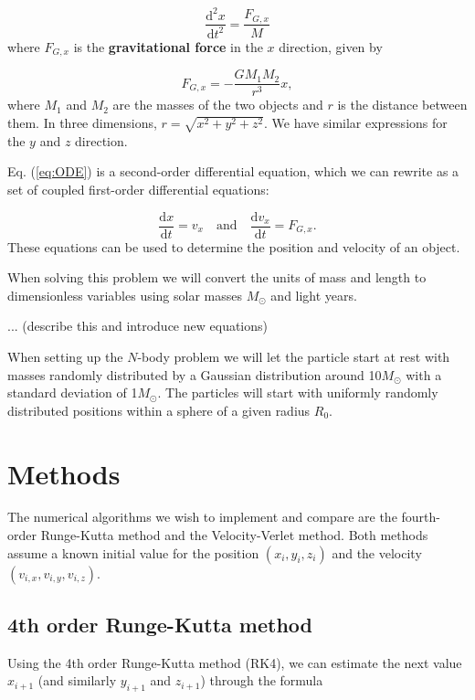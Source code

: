 \documentclass{article}
\begin{document}
\begin{multicols}{2}
\begin{equation}\label{eq:ODE}
	\frac{\mathrm{d}^2 x}{\mathrm{d}t^2} = \frac{F_{G,x}}{M}
\end{equation}
where $F_{G,x}$ is the \textbf{gravitational force} in the $x$ direction, given by 

\begin{equation}\label{eq:force_comp}
	F_{G,x} = - \frac{G M_1 M_2}{r^3}x,
\end{equation}
where $M_1$ and $M_2$ are the masses of the two objects and $r$ is the distance between them. In three dimensions, $r = \sqrt{x^2 + y^2 + z^2}$. We have similar expressions for the $y$ and $z$ direction.

Eq. (\ref{eq:ODE}) is a second-order differential equation, which we can rewrite as a set of coupled first-order differential equations:

\begin{equation}
	\frac{\mathrm{d}x}{\mathrm{d}t} = v_x  \quad \mathrm{and} \quad \frac{\mathrm{d}v_x}{\mathrm{d}t} = F_{G,x}.
\end{equation}
These equations can be used to determine the position and velocity of an object.

When solving this problem we will convert the units of mass and length to dimensionless variables using solar masses $M_{\odot}$ and light years. 

... (describe this and introduce new equations)

When setting up the $N$-body problem we will let the particle start at rest with masses randomly distributed by a Gaussian distribution around 10$M_{\odot}$ with a standard deviation of 1$M_{\odot}$. The particles will start with uniformly randomly distributed positions within a sphere of a given radius $R_0$. 




\section{Methods}

The numerical algorithms we wish to implement and compare are the fourth-order Runge-Kutta method and the Velocity-Verlet method. Both methods assume a known initial value for the position $(x_i,y_i,z_i)$ and the velocity $(v_{i,x},v_{i,y},v_{i,z})$. 


\subsection{4th order Runge-Kutta method}
Using the 4th order Runge-Kutta method (RK4), we can estimate the next value $x_{i+1}$ (and similarly $y_{i+1}$ and $z_{i+1}$) through the formula


\end{multicols}
\end{document}

